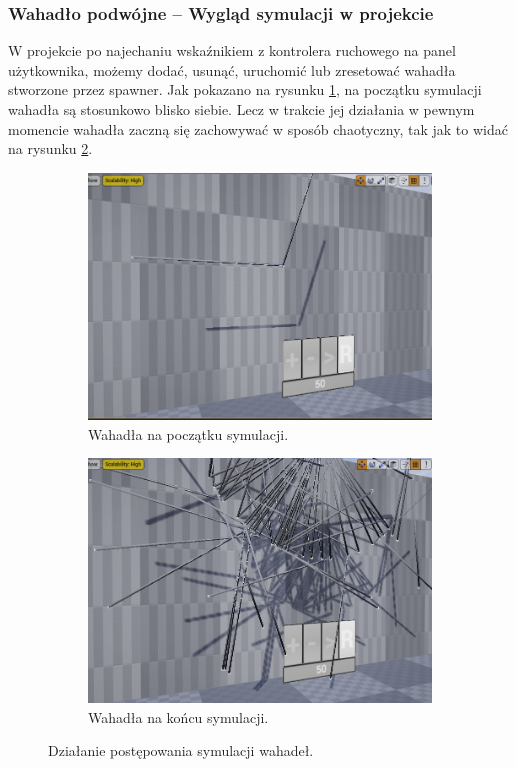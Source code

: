 \documentclass[a4paper,12pt,reqno]{article}
\begin{document}
\subsubsection{Wahadło podwójne – Wygląd symulacji w projekcie}

W projekcie po najechaniu wskaźnikiem z kontrolera ruchowego na panel użytkownika, możemy dodać, usunąć, uruchomić lub zresetować wahadła stworzone przez spawner. Jak pokazano na rysunku \ref{Pendulum_in_project:subref_a}, na początku symulacji wahadła są stosunkowo blisko siebie. Lecz w trakcie jej działania w pewnym momencie wahadła zaczną się zachowywać w sposób chaotyczny, tak jak to widać na rysunku \ref{Pendulum_in_project:subref_b}.


\begin{figure}[!ht]%
	\centering
	\begin{subfigure}{.5\textwidth}
		\centering
		\includegraphics[width=.95\linewidth]{graphics/pendulum/PendulumInUE_1.png}
		\caption{Wahadła na początku symulacji.}	
		\label{Pendulum_in_project:subref_a}
	\end{subfigure}%
	\hfill
	\begin{subfigure}{.5\textwidth}
		\centering
		\includegraphics[width=.95\linewidth]{graphics/pendulum/PendulumInUE_2.png}
		\caption{Wahadła na końcu symulacji.}
		\label{Pendulum_in_project:subref_b}
	\end{subfigure}%
	

\caption{Działanie postępowania symulacji wahadeł.}
\label{Pendulum_in_project}
\end{figure}
\end{document}
